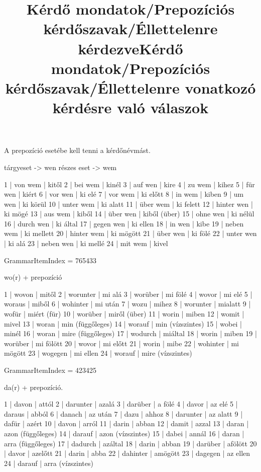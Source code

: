 \begin{desc}
A prepozíció esetébe kell tenni a kérdőnévmást.

tárgyeset -> wen
részes eset -> wem
\end{desc}

\begin{exmp}
1 | von wem | kitől
2 | bei wem | kinél
3 | auf wen | kire
4 | zu wem | kihez
5 | für wen | kiért
6 | vor wen | ki elé
7 | vor wem | ki előtt
8 | in wem | kiben
9 | um wen | ki körül
10 | unter wem | ki alatt
11 | über wem | ki felett
12 | hinter wen | ki mögé
13 | aus wem | kiből
14 | über wen | kiből (über)
15 | ohne wen | ki nélül
16 | durch wen | ki által
17 | gegen wen | ki ellen
18 | in wen | kibe
19 | neben wem | ki mellett
20 | hinter wem | ki mögött
21 | über wen | ki fölé
22 | unter wen | ki alá
23 | neben wen | ki mellé
24 | mit wem | kivel
\end{exmp}

\title{Kérdő mondatok/Prepozíciós kérdőszavak/Éllettelenre kérdezve}

GrammarItemIndex = 765433

\begin{desc}
wo(r) + prepozíció
\end{desc}

\begin{exmp}
1 | wovon | mitől
2 | worunter | mi alá
3 | worüber | mi fölé
4 | wovor | mi elé
5 | woraus | miből
6 | wohinter | mi után
7 | wozu | mihez
8 | worunter | mialatt
9 | wofür | miért (für)
10 | worüber | miről (über)
11 | worin | miben
12 | womit | mivel
13 | woran | min (függőleges)
14 | worauf | min (vízszintes)
15 | wobei | minél
16 | woran | mire (függőleges)
17 | wodurch | miáltal
18 | worin | miben
19 | worüber | mi fölött
20 | wovor | mi előtt
21 | worin | mibe
22 | wohinter | mi mögött
23 | wogegen | mi ellen
24 | worauf | mire (vízszintes)
\end{exmp}

\title{Kérdő mondatok/Prepozíciós kérdőszavak/Éllettelenre vonatkozó kérdésre való válaszok}

GrammarItemIndex = 423425

\begin{desc}
da(r) + prepozíció.
\end{desc}

\begin{exmp}
1 | davon | attól
2 | darunter | azalá
3 | darüber | a fölé
4 | davor | az elé
5 | daraus | abból
6 | danach | az után
7 | dazu | ahhoz
8 | darunter | az alatt
9 | dafür | azért
10 | davon | arról
11 | darin | abban
12 | damit | azzal
13 | daran | azon (függőleges)
14 | darauf | azon (vízszintes)
15 | dabei | annál
16 | daran | arra (függőleges)
17 | dadurch | azáltal
18 | darin | abban
19 | darüber | afölött
20 | davor | azelőtt
21 | darin | abba
22 | dahinter | amögött
23 | dagegen | az ellen
24 | darauf | arra (vízszintes)
\end{exmp}

